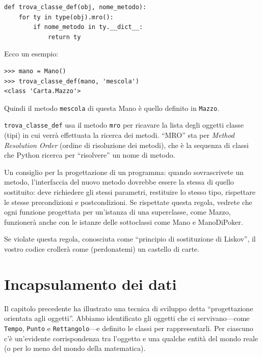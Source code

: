 \documentclass[10pt]{book}
\begin{document}
\begin{verbatim}
def trova_classe_def(obj, nome_metodo):
    for ty in type(obj).mro():
        if nome_metodo in ty.__dict__:
            return ty
\end{verbatim}
%
Ecco un esempio:

\begin{verbatim}
>>> mano = Mano()
>>> trova_classe_def(mano, 'mescola')
<class 'Carta.Mazzo'>
\end{verbatim}
%
Quindi il metodo {\tt mescola} di questa Mano è quello definito in {\tt Mazzo}.

\verb"trova_classe_def" usa il metodo {\tt mro} per ricavare la lista degli oggetti classe (tipi) in cui verrà effettuata la ricerca dei metodi.  ``MRO'' sta per {\em Method Resolution Order} (ordine di risoluzione dei metodi), che è la sequenza di classi che Python ricerca per ``risolvere'' un nome di metodo.

Un consiglio per la progettazione di un programma: quando sovrascrivete un metodo, l'interfaccia del nuovo metodo dovrebbe essere la stessa di quello sostituito: deve richiedere gli stessi parametri, restituire lo stesso tipo, rispettare le stesse precondizioni e postcondizioni. Se rispettate questa regola, vedrete che ogni funzione progettata per un'istanza di una superclasse, come Mazzo, funzionerà anche con le istanze delle sottoclassi come Mano e ManoDiPoker.

Se violate questa regola, conosciuta come ``principio di sostituzione di Liskov'', il vostro codice crollerà come (perdonatemi) un castello di carte.

\section{Incapsulamento dei dati}

Il capitolo precedente ha illustrato una tecnica di sviluppo detta
``progettazione orientata agli oggetti''.  Abbiamo identificato gli oggetti che ci servivano---come {\tt Tempo}, {\tt Punto} e {\tt Rettangolo}---e definito le classi per rappresentarli. Per ciascuno c'è un'evidente corrispondenza tra l'oggetto e una qualche entità del mondo reale (o per lo meno del mondo della matematica).
\end{document}
